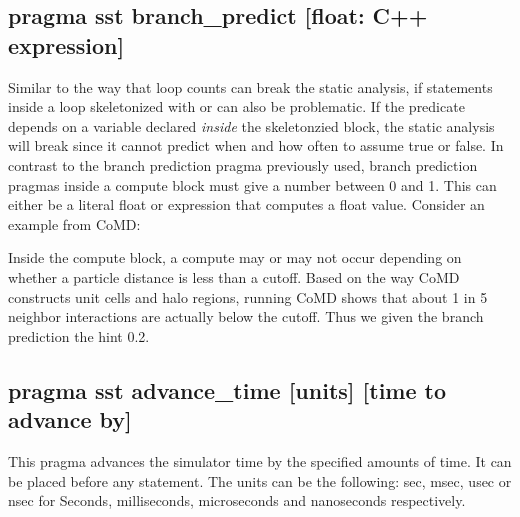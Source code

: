 \subsection{pragma sst branch\_predict [float: C++ expression]}
Similar to the way that loop counts can break the static analysis, if statements inside a loop skeletonized with  or  can also be problematic.
If the predicate depends on a variable declared \emph{inside} the skeletonzied block,
the static analysis will break since it cannot predict when and how often to assume true or false.
In contrast to the branch prediction pragma previously used, branch prediction pragmas inside a compute block must give a number between 0 and 1.
This can either be a literal float or expression that computes a float value.
Consider an example from CoMD:

\begin{CppCode}
#pragma sst branch_predict 0.2
  if(r2 <= rCut2 && r2 > 0.0){
\end{CppCode}
Inside the compute block, a compute may or may not occur depending on whether a particle distance is less than a cutoff.
Based on the way CoMD constructs unit cells and halo regions, running CoMD shows that about 1 in 5 neighbor interactions are actually below the cutoff.
Thus we given the branch prediction the hint 0.2.

\subsection{pragma sst advance\_time [units] [time to advance by]}
This pragma advances the simulator time by the specified amounts of time. It can be placed before any statement. The units can be the following: sec, msec, usec or nsec for Seconds, milliseconds, microseconds and nanoseconds respectively. 

%
